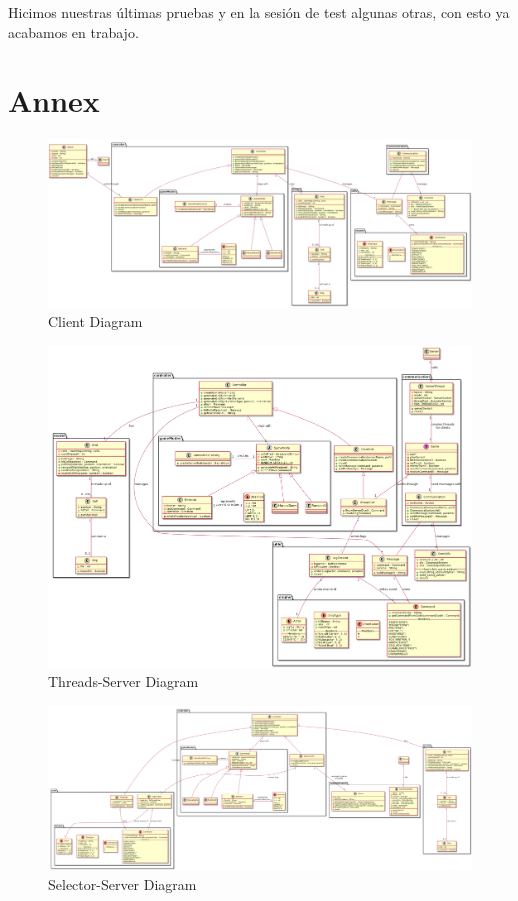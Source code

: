 Hicimos nuestras últimas pruebas y en la sesión de test algunas otras, con esto ya acabamos en trabajo.
\newpage
\section*{Annex}
\begin{figure}
    \includegraphics[width=\textwidth,height=\textheight,keepaspectratio]{../diagrams/class-diagrams/clientClasses.png}
    \caption{Client Diagram}
    \label{fig:PropProf}
\end{figure}
\begin{figure}
    \includegraphics[width=\textwidth,height=\textheight,keepaspectratio]{../diagrams/class-diagrams/threadsClasses.png}
    \caption{Threads-Server Diagram}
    \label{fig:PropProf}
\end{figure}
\begin{figure}
    \includegraphics[width=\textwidth,height=\textheight,keepaspectratio]{../diagrams/class-diagrams/selectorClasses.png}
    \caption{Selector-Server Diagram}
    \label{fig:PropProf}
\end{figure}

	